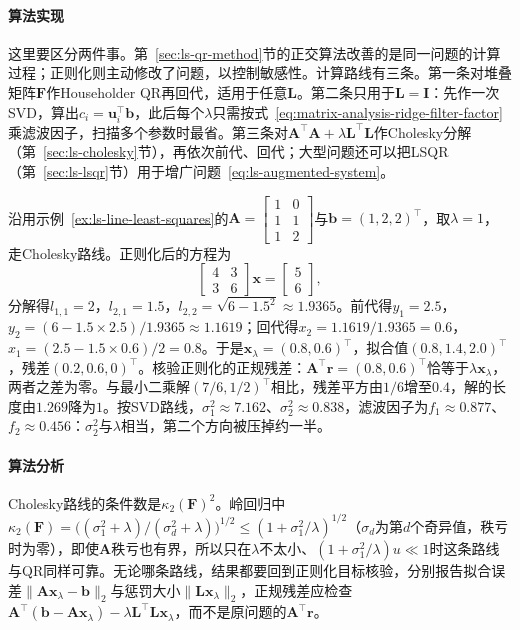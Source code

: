 \paragraph{算法实现}
这里要区分两件事。第~\ref{sec:ls-qr-method}节的正交算法改善的是同一问题的计算过程；正则化则主动修改了问题，以控制敏感性。计算路线有三条。第一条对堆叠矩阵$\bm F$作Householder QR再回代，适用于任意$\bm L$。第二条只用于$\bm L=\bm I$：先作一次SVD，算出$c_i=\bm u_i^\top\bm b$，此后每个$\lambda$只需按式~\eqref{eq:matrix-analysis-ridge-filter-factor}乘滤波因子，扫描多个参数时最省。第三条对$\bm A^\top\bm A+\lambda\bm L^\top\bm L$作Cholesky分解（第~\ref{sec:ls-cholesky}节），再依次前代、回代；大型问题还可以把LSQR（第~\ref{sec:ls-lsqr}节）用于增广问题~\eqref{eq:ls-augmented-system}。

\begin{example}[直线拟合的岭回归]
\label{ex:ls-ridge-line-fit}
沿用示例~\ref{ex:ls-line-least-squares}的$\bm A=\left[\begin{smallmatrix}1&0\\1&1\\1&2\end{smallmatrix}\right]$与$\bm b=(1,2,2)^\top$，取$\lambda=1$，走Cholesky路线。正则化后的方程为
\[
 \begin{bmatrix}4&3\\3&6\end{bmatrix}\bm x=\begin{bmatrix}5\\6\end{bmatrix},
\]
分解得$l_{1,1}=2$，$l_{2,1}=1.5$，$l_{2,2}=\sqrt{6-1.5^2}\approx1.9365$。前代得$y_1=2.5$，$y_2=(6-1.5\times2.5)/1.9365\approx1.1619$；回代得$x_2=1.1619/1.9365=0.6$，$x_1=(2.5-1.5\times0.6)/2=0.8$。于是$\bm x_\lambda=(0.8,0.6)^\top$，拟合值$(0.8,1.4,2.0)^\top$，残差$(0.2,0.6,0)^\top$。核验正则化的正规残差：$\bm A^\top\bm r=(0.8,0.6)^\top$恰等于$\lambda\bm x_\lambda$，两者之差为零。与最小二乘解$(7/6,1/2)^\top$相比，残差平方由$1/6$增至$0.4$，解的长度由$1.269$降为$1$。按SVD路线，$\sigma_1^2\approx7.162$、$\sigma_2^2\approx0.838$，滤波因子为$f_1\approx0.877$、$f_2\approx0.456$：$\sigma_2^2$与$\lambda$相当，第二个方向被压掉约一半。
\end{example}

\paragraph{算法分析}
Cholesky路线的条件数是$\kappa_2(\bm F)^2$。岭回归中$\kappa_2(\bm F)=\bigl((\sigma_1^2+\lambda)/(\sigma_d^2+\lambda)\bigr)^{1/2}\leq(1+\sigma_1^2/\lambda)^{1/2}$（$\sigma_d$为第$d$个奇异值，秩亏时为零），即使$\bm A$秩亏也有界，所以只在$\lambda$不太小、$(1+\sigma_1^2/\lambda)u\ll1$时这条路线与QR同样可靠。无论哪条路线，结果都要回到正则化目标核验，分别报告拟合误差$\lVert\bm A\bm x_\lambda-\bm b\rVert_2$与惩罚大小$\lVert\bm L\bm x_\lambda\rVert_2$，正规残差应检查$\bm A^\top(\bm b-\bm A\bm x_\lambda)-\lambda\bm L^\top\bm L\bm x_\lambda$，而不是原问题的$\bm A^\top\bm r$。

